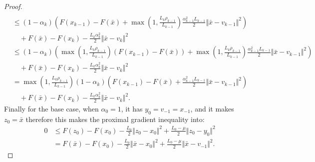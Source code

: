 \documentclass[12pt]{article}
\begin{document}
\begin{proof}
{\begin{align*}
                \\
                &\le 
                (1 - \alpha_k)\left(
                    F(x_{k - 1}) - F(\bar x) 
                    + \max\left(1, \frac{L_k\rho_{k - 1}}{L_{k - 1}}\right)
                    \frac{\alpha_{k - 1}^2L_{k - 1}}{2}\Vert \bar x - v_{k - 1}\Vert^2
                \right) \\&\quad
                    + F(\bar x) - F(x_k)-  \frac{L_k\alpha_k^2}{2}\Vert \bar x - v_k\Vert^2 
                \\
                &\le (1 - \alpha_k)\left(
                    \max\left(1, \frac{L_k\rho_{k - 1}}{L_{k - 1}}\right)(F(x_{k - 1}) - F(\bar x))
                    + \max\left(1, \frac{L_k\rho_{k - 1}}{L_{k - 1}}\right)
                    \frac{\alpha_{k - 1}^2L_{k - 1}}{2}\Vert \bar x - v_{k - 1}\Vert^2
                \right) \\&\quad 
                    + F(\bar x) - F(x_k)-  \frac{L_k\alpha_k^2}{2}\Vert \bar x - v_k\Vert^2 
                \\
                &= 
                \max\left(1, \frac{L_k\rho_{k - 1}}{L_{k - 1}}\right)(1 - \alpha_k)\left(
                    F(x_{k - 1}) - F(\bar x) 
                    + \frac{\alpha_{k - 1}^2L_{k - 1}}{2}\Vert \bar x - v_{k - 1}\Vert^2
                \right) \\&\quad
                    + F(\bar x) - F(x_k)-  \frac{L_k\alpha_k^2}{2}\Vert \bar x - v_k\Vert^2. 
            \end{align*}
            }
            Finally for the base case, when $\alpha_0 = 1$, it has $y_0 = v_{-1} = x_{-1}$, and it makes $z_0 = \bar x$ therefore this makes the proximal gradient inequality into:
            \begin{align*}
                0 &\le F(z_0) - F(x_{0}) - \frac{L_0}{2}\Vert z_0 - x_0\Vert^2 + \frac{L_0 - \mu}{2}\Vert z_0 - y_0\Vert^2
                \\
                &= F(\bar x) - F(x_0) - \frac{L_0}{2}\Vert \bar x - x_0\Vert^2 + \frac{L_0 - \mu}{2}\Vert \bar x - v_{-1}\Vert^2. 
            \end{align*}
            

\end{proof}
\end{document}
